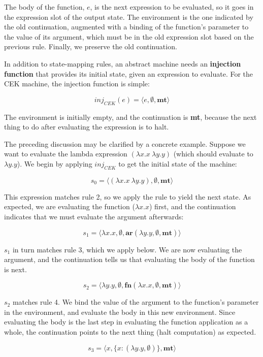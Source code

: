 \documentclass{article}
\begin{document}
The body of the function, $e$, is the next expression to be evaluated, so it goes in the expression slot of the output state. The environment is the one indicated by the old continuation, augmented with a binding of the function's parameter to the value of its argument, which must be in the old expression slot based on the previous rule. Finally, we preserve the old continuation.

In addition to state-mapping rules, an abstract machine needs an \textbf{injection function} that provides its initial state, given an expression to evaluate. For the CEK machine, the injection function is simple:

$$ inj_{CEK}(e) = \langle e, \emptyset, \textbf{mt} \rangle $$

The environment is initially empty, and the continuation is \textbf{mt}, because the next thing to do after evaluating the expression is to halt.

The preceding discussion may be clarified by a concrete example. Suppose we want to evaluate the lambda expression $(\lambda x.x\ \lambda y.y)$ (which should evaluate to $\lambda y.y$). We begin by applying $inj_{CEK}$ to get the initial state of the machine:

$$ s_0 = \langle (\lambda x.x\ \lambda y.y), \emptyset, \textbf{mt} \rangle $$

This expression matches rule 2, so we apply the rule to yield the next state. As expected, we are evaluating the function ($\lambda x.x$) first, and the continuation indicates that we must evaluate the argument afterwards:

$$ s_1 = \langle \lambda x.x, \emptyset, \textbf{ar}(\lambda y.y, \emptyset, \textbf{mt}) \rangle $$

$s_1$ in turn matches rule 3, which we apply below. We are now evaluating the argument, and the continuation tells us that evaluating the body of the function is next.

$$ s_2 = \langle \lambda y.y, \emptyset, \textbf{fn}(\lambda x.x, \emptyset, \textbf{mt}) \rangle $$

$s_2$ matches rule 4. We bind the value of the argument to the function's parameter in the environment, and evaluate the body in this new environment. Since evaluating the body is the last step in evaluating the function application as a whole, the continuation points to the next thing (halt computation) as expected.

$$ s_3 = \langle x, \{ x: (\lambda y.y, \emptyset) \}, \textbf{mt} \rangle $$
\end{document}
